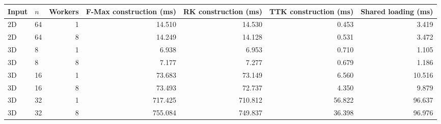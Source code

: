 \begin{tabular}{llrrrrr}
\hline
Input & $n$ & Workers & F-Max construction (ms) & RK construction (ms) & TTK construction (ms) & Shared loading (ms) \\
\hline
2D & 64 & 1 & 14.510 & 14.530 & 0.453 & 3.419 \\
2D & 64 & 8 & 14.249 & 14.128 & 0.531 & 3.472 \\
3D & 8 & 1 & 6.938 & 6.953 & 0.710 & 1.105 \\
3D & 8 & 8 & 7.177 & 7.277 & 0.679 & 1.186 \\
3D & 16 & 1 & 73.683 & 73.149 & 6.560 & 10.516 \\
3D & 16 & 8 & 73.493 & 72.737 & 4.350 & 9.879 \\
3D & 32 & 1 & 717.425 & 710.812 & 56.822 & 96.637 \\
3D & 32 & 8 & 755.084 & 749.837 & 36.398 & 96.976 \\
\hline
\end{tabular}
